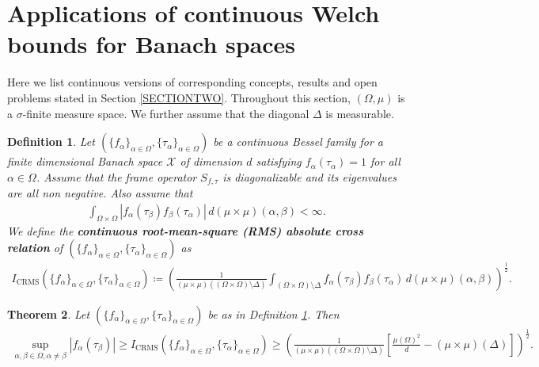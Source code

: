 \documentclass{amsart}
\newtheorem{theorem}{Theorem}[section]
\newtheorem{definition}[theorem]{Definition}
\begin{document}
\section{Applications of continuous Welch bounds for Banach spaces}
 Here we list continuous versions of corresponding concepts, results and open problems stated in   Section \ref{SECTIONTWO}.  Throughout this section, $(\Omega, \mu)$ is a $\sigma$-finite measure space. We further assume that the diagonal $\Delta$ is measurable.
 \begin{definition}\label{CRMSBANACH}
 Let  $ (\{f_\alpha\}_{\alpha\in \Omega}, \{\tau_\alpha\}_{\alpha\in \Omega})$ be a 	 continuous Bessel  family for  a finite dimensional Banach space $\mathcal{X}$ of dimension $d$   satisfying  $f_\alpha(\tau_\alpha)=1$ for all $\alpha \in \Omega$. Assume that  the  frame operator 
 	$	S_{f, \tau}$  is diagonalizable and its eigenvalues are all non negative. Also assume that 
 	\begin{align*}
 		\int_{\Omega\times\Omega}|f_\alpha(\tau_\beta)f_\beta(\tau_\alpha)|\, d(\mu\times\mu)(\alpha,\beta)<\infty.
 	\end{align*} 
 	  We define the \textbf{ continuous root-mean-square (RMS) absolute cross relation} of  $ (\{f_\alpha\}_{\alpha\in \Omega}, \{\tau_\alpha\}_{\alpha\in \Omega})$   as 
 	\begin{align*}
 		I_{\text{CRMS}} (\{f_\alpha\}_{\alpha\in \Omega}, \{\tau_\alpha\}_{\alpha\in \Omega})\coloneqq \left(\frac{1}{(\mu\times\mu)((\Omega\times\Omega)\setminus\Delta)}\int_{(\Omega\times\Omega)\setminus\Delta}f_\alpha(\tau_\beta)f_\beta(\tau_\alpha)\, d(\mu\times\mu)(\alpha,\beta)\right)^\frac{1}{2}.
 	\end{align*}
 \end{definition}
	 \begin{theorem}
 	Let $ (\{f_\alpha\}_{\alpha\in \Omega}, \{\tau_\alpha\}_{\alpha\in \Omega})$ be as in Definition \ref{CRMSBANACH}. Then
 	\begin{align*}
 	\sup_{\alpha, \beta \in \Omega, \alpha\neq \beta}|f_\alpha(\tau_\beta)| \geq 	I_{\text{CRMS}} (\{f_\alpha\}_{\alpha\in \Omega}, \{\tau_\alpha\}_{\alpha\in \Omega})\geq \left(\frac{1}{(\mu\times\mu)((\Omega\times\Omega)\setminus\Delta)}\left[\frac{\mu(\Omega)^2}{d}-(\mu\times\mu)(\Delta)\right]\right)^\frac{1}{2}.
 	\end{align*}
 \end{theorem}
\end{document}

